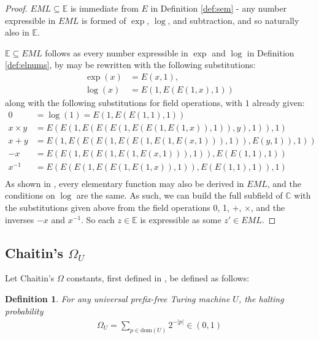 \documentclass[a4paper,10pt]{article}
\newtheorem{definition}{Definition}
\begin{document}
\begin{proof}
    $ EML \subseteq \mathbb{E}$ is immediate from $E$ in Definition \ref{def:sem} - any number expressible in $EML$ is formed of $\exp$, $\log$, and subtraction, and so naturally also in $\mathbb{E}$.

    $\mathbb{E} \subseteq EML$ follows as every number expressible in $\exp$ and $\log$ in Definition \ref{def:elnums}, by \cite{Odrzywolek2026} may be rewritten with the following substitutions:
    \begin{align*}
        \exp(x) &= E(x,1), \\  
        \log(x) &= E(1,E(E(1,x),1))
    \end{align*} along with the following substitutions for field operations, with $1$ already given:
    \begin{align*}
        0 &= \log(1) = E(1, E(E(1,1), 1))\\
        x \times y &= E(E(1,E(E(E(1,E(E(1,E(1,x)),1)),y),1)),1) \\
        x + y &= E(1,E(E(E(1,E(E(1,E(1,E(x,1))),1)),E(y,1)),1)) \\
        -x &= E(E(1,E(E(1,E(1,E(x,1))),1)),E(E(1,1),1)) \\
        x^{-1} &= E(E(E(1,E(E(1,E(1,x)),1)),E(E(1,1),1)),1) \\
    \end{align*} 
    As shown in \cite{Odrzywolek2026}, every elementary function may also be derived in $EML$, and the conditions on $\log$ are the same. As such, we can build the full subfield of $\mathbb{C}$ with the substitutions given above from the field operations 0, 1, $+$, $\times$, and the inverses $-x$ and $x^{-1}$. So each $z \in \mathbb{E}$ is expressible as some $z' \in EML$.
\end{proof}

\subsection{Chaitin's $\Omega_U$}

Let Chaitin's $\Omega$ constants, first defined in \cite{Chaitin1975}, be defined as follows:

\begin{definition}\label{def:omega}
    For any universal prefix-free Turing machine $U$, the halting probability
\begin{align}
    \Omega_U = \sum_{p\in \text{dom}(U)} 2^{-|p|} \in (0,1)
\end{align}
\end{definition}
\end{document}
